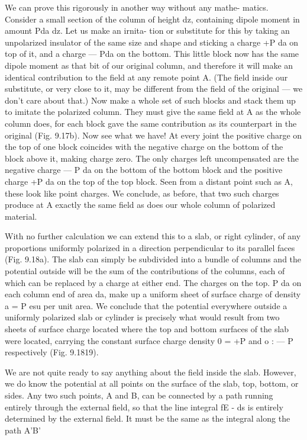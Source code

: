 { 

 

We can prove this rigorously in another way without any mathe-
matics. Consider a small section of the column of height dz, containing
dipole moment in amount Pda dz. Let us make an irnita-
tion or substitute for this by taking an unpolarized insulator of the
same size and shape and sticking a charge +P da on top of it, and a
charge  --- Pda on the bottom. This little block now has the same
dipole moment as that bit of our original column, and therefore it
will make an identical contribution to the field at any remote point A.
(The field inside our substitute, or very close to it, may be different
from the field of the original --- we don't care about that.) Now make
a whole set of such blocks and stack them up to imitate the polarized
column. They must give the same field at A as the whole column
does, for each block gave the same contribution as its counterpart
in the original (Fig. 9.17b). Now see what we have! At every joint
the positive charge on the top of one block coincides with the negative
charge on the bottom of the block above it, making charge zero.
The only charges left uncompensated are the negative charge  --- P da
on the bottom of the bottom block and the positive charge +P da on
the top of the top block. Seen from a distant point such as A, these
look like point charges. We conclude, as before, that two such
charges produce at A exactly the same field as does our whole column
of polarized material.

With no further calculation we can extend this to a slab, or right
cylinder, of any proportions uniformly polarized in a direction perpendicular
to its parallel faces (Fig. 9.18a). The slab can simply be
subdivided into a bundle of columns and the potential outside will
be the sum of the contributions of the columns, each of which can
be replaced by a charge at either end. The charges on the top. P da
on each column end of area da, make up a uniform sheet of surface
charge of density a = P esu per unit area. We conclude that the
potential everywhere outside a uniformly polarized slab or cylinder
is precisely what would result from two sheets of surface charge
located where the top and bottom surfaces of the slab were located,
carrying the constant surface charge density 0 = +P and o :  --- P
respectively (Fig. 9.1819).

We are not quite ready to say anything about the field inside the
slab. However, we do know the potential at all points on the surface
of the slab, top, bottom, or sides. Any two such points, A and B,
can be connected by a path running entirely through the external
field, so that the line integral fE - ds is entirely determined by the
external field. It must be the same as the integral along the path A'B'

}

